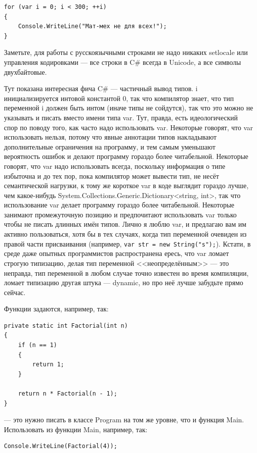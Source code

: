 \documentclass{../../text-style}
\begin{document}
\begin{verbatim}
for (var i = 0; i < 300; ++i)
{
    Console.WriteLine("Мат-мех не для всех!");
}
\end{verbatim}

Заметьте, для работы с русскоязычными строками не надо никаких setlocale или управления кодировками --- все строки в C\# всегда в Unicode, а все символы двухбайтовые.

Тут показана интересная фича C\# --- частичный вывод типов. i инициализируется интовой константой 0, так что компилятор знает, что тип переменной i должен быть интом (иначе типы не сойдутся), так что это можно не указывать и писать вместо имени типа var. Тут, правда, есть идеологический спор по поводу того, как часто надо использовать var. Некоторые говорят, что var использовать нельзя, потому что явные аннотации типов накладывают дополнительные ограничения на программу, и тем самым уменьшают вероятность ошибок и делают программу гораздо более читабельной. Некоторые говорят, что var надо использовать всегда, поскольку информация о типе избыточна и до тех пор, пока компилятор может вывести тип, не несёт семантической нагрузки, к тому же короткое var в коде выглядит гораздо лучше, чем какое-нибудь System.Collections.Generic.Dictionary<string, int>, так что использование var делает программу гораздо более читабельной. Некоторые занимают промежуточную позицию и предпочитают использовать var только чтобы не писать длинных имён типов. Лично я люблю var, и предлагаю вам им активно пользоваться, хотя бы в тех случаях, когда тип переменной очевиден из правой части присваивания (например, \texttt{var str = new String("s");}). Кстати, в среде даже опытных программистов распространена ересь, что var ломает строгую типизацию, делая тип переменной <<неопределённым>> --- это неправда, тип переменной в любом случае точно известен во время компиляции, ломает типизацию другая штука --- dynamic, но про неё лучше забудьте прямо сейчас.

Функции задаются, например, так:

\begin{verbatim}
private static int Factorial(int n)
{
    if (n == 1)
    {
        return 1;
    }

    return n * Factorial(n - 1);
}
\end{verbatim}

--- это нужно писать в классе Program на том же уровне, что и функция Main. Использовать из функции Main, например, так:

\begin{verbatim}
Console.WriteLine(Factorial(4));
\end{verbatim}
\end{document}
